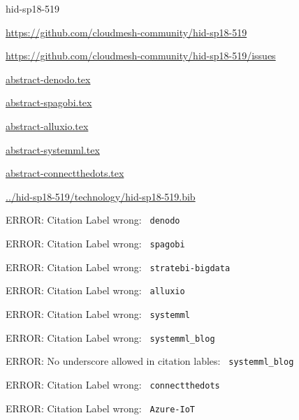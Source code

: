 \begin{IU}

hid-sp18-519

\url{https://github.com/cloudmesh-community/hid-sp18-519}

\url{https://github.com/cloudmesh-community/hid-sp18-519/issues}

\href{https://github.com/cloudmesh-community/hid-sp18-519/blob/master//technology/abstract-denodo.tex}{abstract-denodo.tex}

\href{https://github.com/cloudmesh-community/hid-sp18-519/blob/master//technology/abstract-spagobi.tex}{abstract-spagobi.tex}

\href{https://github.com/cloudmesh-community/hid-sp18-519/blob/master//technology/abstract-alluxio.tex}{abstract-alluxio.tex}

\href{https://github.com/cloudmesh-community/hid-sp18-519/blob/master//technology/abstract-systemml.tex}{abstract-systemml.tex}

\href{https://github.com/cloudmesh-community/hid-sp18-519/blob/master//technology/abstract-connectthedots.tex}{abstract-connectthedots.tex}

\href{https://github.com/cloudmesh-community/hid-sp18-519/blob/master//technology/hid-sp18-519.bib}{../hid-sp18-519/technology/hid-sp18-519.bib}

 ERROR: Citation Label wrong: \verb| denodo |

 ERROR: Citation Label wrong: \verb| spagobi |

 ERROR: Citation Label wrong: \verb| stratebi-bigdata |

 ERROR: Citation Label wrong: \verb| alluxio |

 ERROR: Citation Label wrong: \verb| systemml |

 ERROR: Citation Label wrong: \verb| systemml_blog |

 ERROR: No underscore allowed in citation lables: \verb| systemml_blog |

 ERROR: Citation Label wrong: \verb| connectthedots |

 ERROR: Citation Label wrong: \verb| Azure-IoT |

\end{IU}



